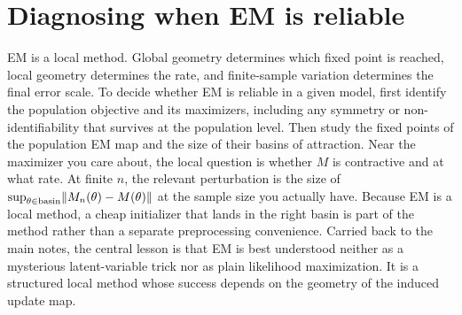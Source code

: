 \documentclass[11pt]{article}
\makeatletter
\def@path{{../../}{../}{Lecture Tex/}}
\makeatother
\begin{document}
\clearpage
\section{Diagnosing when EM is reliable}
\label{sec:em-checklist}

EM is a local method.
Global geometry determines which fixed point is reached, local geometry determines the rate, and finite-sample variation determines the final error scale.
To decide whether EM is reliable in a given model, first identify the population objective and its maximizers, including any symmetry or non-identifiability that survives at the population level.
Then study the fixed points of the population EM map and the size of their basins of attraction.
Near the maximizer you care about, the local question is whether $M$ is contractive and at what rate.
At finite $n$, the relevant perturbation is the size of $\sup_{\theta\in\text{basin}}\lVert M_n(\theta)-M(\theta)\rVert$ at the sample size you actually have.
Because EM is a local method, a cheap initializer that lands in the right basin is part of the method rather than a separate preprocessing convenience.
Carried back to the main notes, the central lesson is that EM is best understood neither as a mysterious latent-variable trick nor as plain likelihood maximization.
It is a structured local method whose success depends on the geometry of the induced update map.


\makeatletter
\begingroup
{}\@empty
{}
\endgroup
\makeatother

\end{document}
